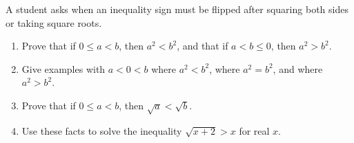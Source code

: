 A student asks when an inequality sign must be flipped after squaring both sides or taking square roots.
\begin{enumerate}
\item[(a)] Prove that if $0\le a<b$, then $a^2<b^2$, and that if $a<b\le0$, then $a^2>b^2$.
\item[(b)] Give examples with $a<0<b$ where $a^2<b^2$, where $a^2=b^2$, and where $a^2>b^2$.
\item[(c)] Prove that if $0\le a<b$, then $\sqrt a<\sqrt b$.
\item[(d)] Use these facts to solve the inequality $\sqrt{x+2}>x$ for real $x$.
\end{enumerate}
